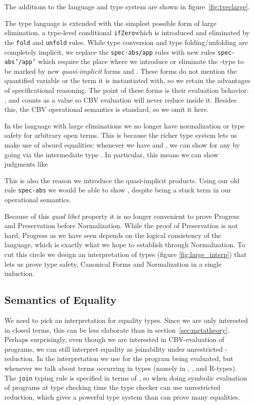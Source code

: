 \documentclass[copyright]{eptcs}
\newcommand{\ifzero}[0]{\texttt{ifZero}}
\begin{document}
The additions to the language and type system are shown in
figure~\ref{fig:tveclarge}. 

The type language is extended with the simplest possible form of large elimination,
a type-level conditional \ifzero which is introduced and
eliminated by the \texttt{fold} and \texttt{unfold} rules.  While type
conversion and type folding/unfolding are completely implicit, we
replace the \texttt{spec-abs/app} rules with new rules
\texttt{spec-abs'/app'} which require the place where we introduce or
eliminate the -type to be marked by new \emph{quasi-implicit}
forms  and . These forms do not mention the
quantified variable or the term it is instantiated with, so we retain
the advantages of specificational reasoning. The point of these forms
is their evaluation behavior: , and
 counts as a value so CBV evaluation will never reduce
inside it. Besides this, the CBV operational semantics is standard, so
we omit it here.

In the language with large eliminations we no longer have
normalization or type safety for arbitrary open terms. This is because
the richer type system lets us make use of absurd equalities: whenever we
have  and , we can
show  for any  by going via the
intermediate type . In particular, this
means we  can show judgments like

This is also the reason we introduce the quasi-implicit
products. Using our old rule \texttt{spec-abs} we would be able to
show , despite  being a
stuck term in our operational semantics.

Because of this \emph{quod libet} property it is no longer convenient
to prove Progress and Preservation before Normalization. While the
proof of Preservation is not hard, Progress as we have seen depends on
the logical consistency of the language, which is exactly what we hope
to establish through Normalization. To cut this circle we design an
interpretation of types (figure \ref{fig:large_interp}) that lets us
prove type safety, Canonical Forms and Normalization in a single
induction.

\subsection{Semantics of Equality}
We need to pick an interpretation for equality types. Since we
are only interested in closed terms, this can be less elaborate than
in section~\ref{sec:metatheory}. Perhaps surprisingly, even though we
are interested in CBV-evaluation of programs, we can still interpret
equality as joinability  under unrestricted -reduction. 
In the interpretation we use  for the
program being evaluated, but  whenever we talk about terms
occurring in types (namely in , , and R-types). The
\texttt{join} typing rule is specified in terms of , so
when doing symbolic evaluation of programs at type checking time the 
type checker can use unrestricted reduction, which gives a powerful
type system than can prove many equalities.
\end{document}

